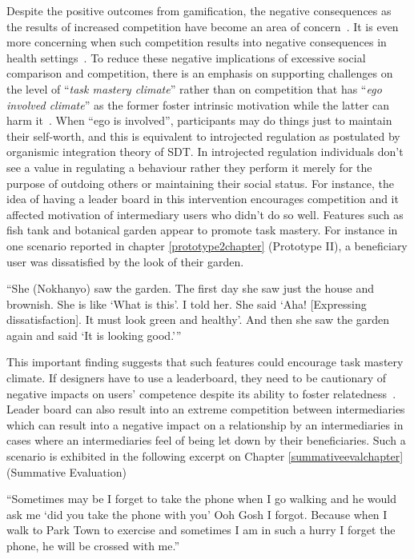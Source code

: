 Despite the positive outcomes from gamification, the negative consequences as the results of increased competition have become an area of concern~\citep{jia2016personality}. It is even more concerning when such competition results into negative consequences in health settings~\citep{grimes2009toward}. To reduce these negative implications of excessive social comparison and competition, there is an emphasis on supporting challenges on the level of ``\emph{task mastery climate}'' rather than on competition that has ``\emph{ego involved climate}'' as the  former foster intrinsic motivation while the latter can harm it~\citep{saksono2015spaceship}. When ``ego is involved'', participants may do things just to maintain their self-worth, and this is equivalent to introjected regulation as postulated by organismic integration theory of SDT\citep{ryan2000:self}. In introjected regulation individuals don't see a value in regulating a behaviour rather they perform it merely for the purpose of outdoing others or maintaining their social status. For instance, the idea of having a leader board in this intervention encourages competition and it affected motivation of intermediary users who didn't do so well. Features such as fish tank and botanical garden appear to promote task mastery. For instance in one scenario reported in chapter \ref{prototype2chapter} (Prototype II),  a beneficiary user was dissatisfied by the look of their garden. 

 {``She (Nokhanyo) saw the garden. The first day she saw just the house and brownish. She
is like `What is this'. I told her. She said `Aha! [Expressing
dissatisfaction]. It must look green and healthy'. And then
she saw the garden again and said `It is looking good.'''}

This important finding suggests that such features could encourage task mastery climate. If designers have to use a leaderboard, they need to be cautionary of negative impacts on users' competence despite its ability to foster relatedness~\citep{sailer2013:psychological}. Leader board can also result into an extreme competition between intermediaries which can result into a negative impact on a relationship by an intermediaries in cases where an intermediaries feel of being let down by their beneficiaries. Such a scenario is exhibited in the following excerpt on Chapter \ref{summativeevalchapter} (Summative Evaluation)
 
 {``Sometimes may be I forget to take the phone when I go walking and he would ask me `did you take the phone with you' Ooh Gosh I forgot.  Because when I walk to Park Town to exercise and sometimes  I am in such a hurry I forget the phone, he will be crossed with me.''} 

